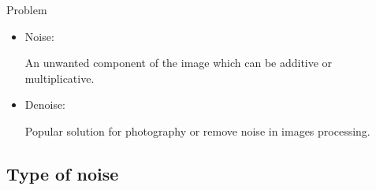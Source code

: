 \documentclass{beamer}
\begin{document}
\begin{frame}{Problem}



\begin{itemize}



\item Noise:

An unwanted component of the image which can
be additive or multiplicative.

\vspace{7mm}

\item Denoise:

Popular solution for photography or remove noise in images processing.



\end{itemize}






\end{frame}

\subsection{Type of noise}
\end{document}
